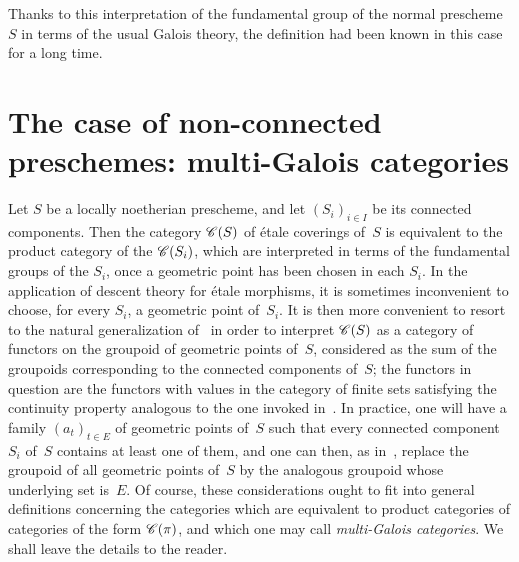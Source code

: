 \begin{remarkstar}
Thanks to this interpretation of the fundamental group of the
normal prescheme $S$ in terms of the usual Galois theory,
the definition had been known in this case for a
long time.
\end{remarkstar}

\section{The case of non-connected preschemes: multi-Galois
categories}
\label{V.9}

Let $S$ be a locally noetherian prescheme, and let
$(S_i)_{i\in I}$ be its connected components. Then the category
$\cal{C}(S)$ of \'etale coverings of~$S$ is equivalent
to the product category of the $\cal{C}(S_i)$, which
are interpreted in terms of the fundamental groups of the $S_i$, once
a geometric point has been chosen in each $S_i$. In the
application of descent theory for \'etale morphisms, it is
sometimes inconvenient to choose, for every $S_i$,
a geometric point of~$S_i$. It is then more convenient
to resort to the natural generalization of~
in order to interpret $\cal{C}(S)$ as a category of functors
on the groupoid of geometric points of~$S$,
considered as the sum of the groupoids corresponding to the
connected components of~$S$; the functors in question are the
functors with values in the category of finite sets
satisfying the continuity property analogous to
the one invoked in~. In practice, one will have a family
$(a_t)_{t\in E}$ of geometric points of~$S$ such that
every connected component $S_i$ of~$S$ contains at least one of them, and one
can then, as in~, replace the groupoid of
all geometric points of~$S$ by the
analogous groupoid whose underlying set is~$E$. Of course, these
considerations ought to fit into
general definitions concerning the categories which are
equivalent to product categories of categories
of the form $\cal{C}(\pi)$, and which one may call
\emph{multi-Galois categories}.
We shall leave the details to the reader.
